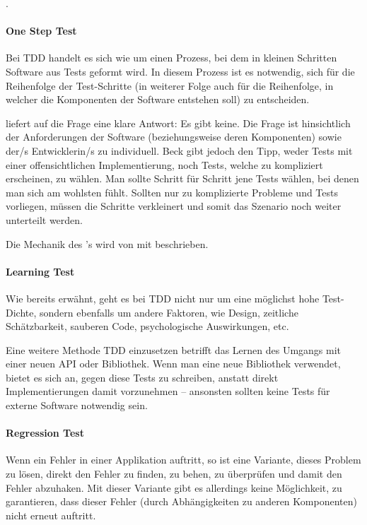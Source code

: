  \autocite[134]{Beck:2003}.

\paragraph{One Step Test}
Bei TDD handelt es sich wie um einen Prozess, bei dem in kleinen Schritten Software aus Tests geformt wird. In diesem Prozess ist es notwendig, sich für die Reihenfolge der Test-Schritte (in weiterer Folge auch für die Reihenfolge, in welcher die Komponenten der Software entstehen soll) zu entscheiden.

\cite[134]{Beck:2003} liefert auf die Frage  eine klare Antwort: Es gibt keine.
Die Frage ist hinsichtlich der Anforderungen der Software (beziehungsweise deren Komponenten) sowie der/s Entwicklerin/s zu individuell.
Beck gibt jedoch den Tipp, weder Tests mit einer offensichtlichen Implementierung, noch Tests, welche zu kompliziert erscheinen, zu wählen. Man sollte Schritt für Schritt jene Tests wählen, bei denen man sich am wohlsten fühlt. Sollten nur zu komplizierte Probleme und Tests vorliegen, müssen die Schritte verkleinert und somit das Szenario noch weiter unterteilt werden.

Die Mechanik des 's wird von \cite[134]{Beck:2003} mit  beschrieben.

\paragraph{Learning Test}

Wie bereits erwähnt, geht es bei TDD nicht nur um eine möglichst hohe Test-Dichte, sondern ebenfalls um andere Faktoren, wie Design, zeitliche Schätzbarkeit, sauberen Code, psychologische Auswirkungen, etc.

Eine weitere Methode TDD einzusetzen betrifft das Lernen des Umgangs mit einer neuen API oder Bibliothek. Wenn man eine neue Bibliothek verwendet, bietet es sich an, gegen diese Tests zu schreiben, anstatt direkt Implementierungen damit vorzunehmen -- ansonsten sollten keine Tests für externe Software notwendig sein.

\paragraph{Regression Test}
Wenn ein Fehler in einer Applikation auftritt, so ist eine Variante, dieses Problem zu lösen, direkt den Fehler zu finden, zu behen, zu überprüfen und damit den Fehler abzuhaken. Mit dieser Variante gibt es allerdings keine Möglichkeit, zu garantieren, dass dieser Fehler (durch Abhängigkeiten zu anderen Komponenten) nicht erneut auftritt.

